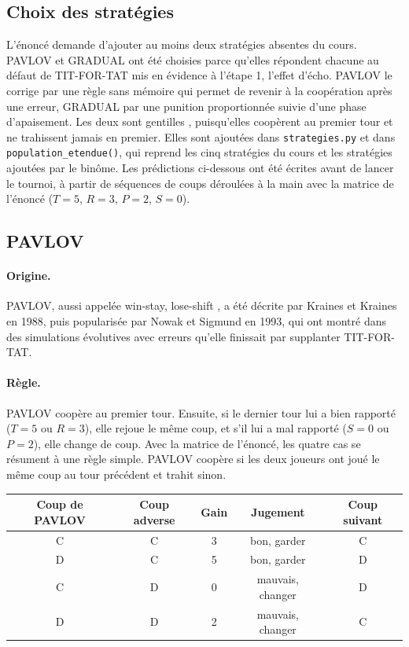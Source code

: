 \documentclass[11pt,a4paper]{article}
\begin{document}
\subsection{Choix des stratégies}
L'énoncé demande d'ajouter au moins deux stratégies absentes du cours. PAVLOV et GRADUAL ont été choisies parce qu'elles
répondent chacune au défaut de TIT-FOR-TAT mis en évidence à l'étape 1, l'effet d'écho. PAVLOV le corrige par une règle sans
mémoire qui permet de revenir à la coopération après une erreur, GRADUAL par une punition proportionnée suivie d'une phase
d'apaisement. Les deux sont \og gentilles \fg{}, puisqu'elles coopèrent au premier tour et ne trahissent jamais en premier. Elles
sont ajoutées dans \texttt{strategies.py} et dans \texttt{population\_etendue()}, qui reprend les cinq stratégies du cours et
les stratégies ajoutées par le binôme. Les prédictions ci-dessous ont été écrites avant de lancer le tournoi, à partir de
séquences de coups déroulées à la main avec la matrice de l'énoncé ($T=5$, $R=3$, $P=2$, $S=0$).

\subsection{PAVLOV}
\paragraph{Origine.} PAVLOV, aussi appelée \og win-stay, lose-shift \fg{}, a été décrite par Kraines et Kraines en 1988, puis
popularisée par Nowak et Sigmund en 1993, qui ont montré dans des simulations évolutives avec erreurs qu'elle finissait par
supplanter TIT-FOR-TAT.

\paragraph{Règle.} PAVLOV coopère au premier tour. Ensuite, si le dernier tour lui a bien rapporté ($T=5$ ou $R=3$), elle
rejoue le même coup, et s'il lui a mal rapporté ($S=0$ ou $P=2$), elle change de coup. Avec la matrice de l'énoncé, les quatre
cas se résument à une règle simple. PAVLOV coopère si les deux joueurs ont joué le même coup au tour précédent et trahit sinon.

\begin{center}
\begin{tabular}{ccccc}
\toprule
Coup de PAVLOV & Coup adverse & Gain & Jugement & Coup suivant \\
\midrule
C & C & 3 & bon, garder & C \\
D & C & 5 & bon, garder & D \\
C & D & 0 & mauvais, changer & D \\
D & D & 2 & mauvais, changer & C \\
\bottomrule
\end{tabular}
\end{center}
\end{document}

